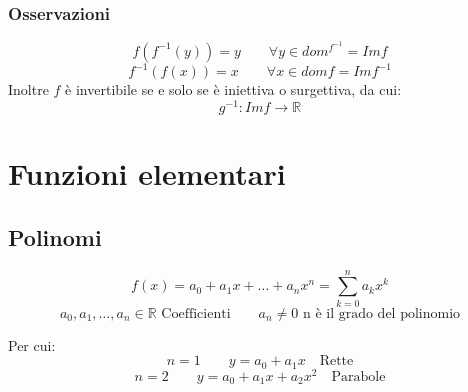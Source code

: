 \documentclass[11pt,a4paper,notitlepage]{report}
\let\numberset\mathbb
\newcommand{\R}{\numberset{R}}
\begin{document}
\subsubsection{Osservazioni}
\[f(f^{-1}(y)) = y \qquad \forall y \in dom^{f^{-1}}=Im f \]
\[f^{-1}(f(x)) = x \qquad \forall x \in dom f = Im f^{-1}\]
Inoltre $f$ è invertibile se e solo se è iniettiva o surgettiva, da cui: 
\[g^{-1}:Im f \rightarrow \R\]

\section{Funzioni elementari}
\subsection{Polinomi}
\[f(x)=a_0+a_1 x + \dots + a_n x^n =\displaystyle\sum_{k=0}^{n} a_k x^k \]
\[a_0, a_1, \dots, a_n \in \R \text{ Coefficienti}\qquad a_n \neq 0 \text{ n è il grado del polinomio}\]

Per cui:
\[n=1 \qquad y=a_0+a_1 x \quad \text{Rette}\]
\[n=2 \qquad y=a_0+a_1 x + a_2 x^2 \quad \text{Parabole}\]
\end{document}
